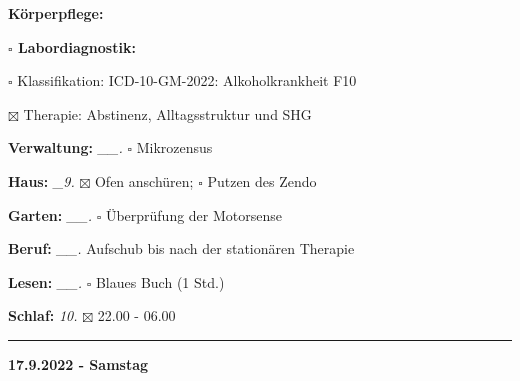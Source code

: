 \documentclass[10pt,a4paper]{article}
\newcommand\prop[1] {{\color {alizarin} {\bf #1}}}        %
\newcommand\rele[1] {{\color {english} \bf {#1}}}         %
\newcommand\mand[1] {{\color {burntorange} {\bf #1}}}     %
\newcommand\ddivide {\vskip -9pt \hrule \vskip 6pt}
\newcommand\bottomspace{\vskip 4pt}
\newcommand\n[1] { {\sl #1.} \hskip 5pt }
\begin{document}
\begin{mdframed}[style=daystyle]
\begin{labeling}{{\mand {Körperpflege:}}}
\begin{minipage}{0.75\textwidth}
\begin{labeling}{{\prop {$\square$ Labordiagnostik:}}}
      \item[$\square$ Klassifikation:]    ICD-10-GM-2022: Alkoholkrankheit F10
      \item[$\boxtimes$ Therapie:]        Abstinenz, Alltagsstruktur und SHG
      \end{labeling}
    \end{minipage}
    \bottomspace
  \item[{\mand {Verwaltung:}}]   \n{\_\_} $\square$ Mikrozensus
  \item[{\mand {Haus:}}]          \n{\_9} $\boxtimes$ Ofen anschüren; $\square$ Putzen des Zendo
  \item[{\mand {Garten:}}]       \n{\_\_} $\square$ Überprüfung der Motorsense
  \item[{\mand {Beruf:}}]        \n{\_\_} Aufschub bis nach der stationären Therapie
  \item[{\mand {Lesen:}}]        \n{\_\_} $\square$ Blaues Buch (1 Std.)
  \item[{\mand {Schlaf:}}]         \n{10} $\boxtimes$ 22.00 - 06.00
  \end{labeling}
\end{mdframed}


\ddivide
{\rele {17.9.2022 - Samstag}}
\end{document}
